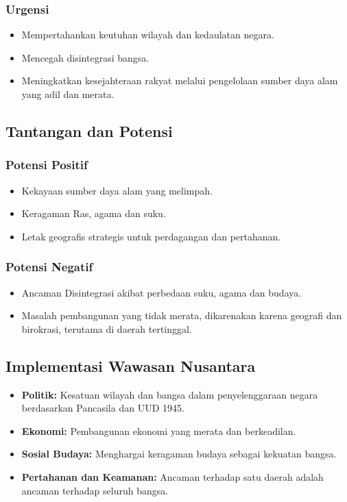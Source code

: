 \documentclass[12pt, a4paper]{article}
\begin{document}
\subsubsection*{Urgensi}
\begin{itemize}
    \item Mempertahankan keutuhan wilayah dan kedaulatan negara.
    \item Mencegah disintegrasi bangsa.
    \item Meningkatkan kesejahteraan rakyat melalui pengelolaan sumber daya alam yang adil dan merata.
\end{itemize}

\subsection*{Tantangan dan Potensi}
\subsubsection*{Potensi Positif}
\begin{itemize}
    \item Kekayaan sumber daya alam yang melimpah.
    \item Keragaman Ras, agama dan suku.
    \item Letak geografis strategis untuk perdagangan dan pertahanan.
\end{itemize}

\subsubsection*{Potensi Negatif}
\begin{itemize}
    \item Ancaman Disintegrasi akibat perbedaan suku, agama dan budaya.
    \item Masalah pembangunan yang tidak merata, dikarenakan karena geografi dan birokrasi, terutama di daerah tertinggal.
\end{itemize}

\subsection*{Implementasi Wawasan Nusantara}
\begin{itemize}
    \item \textbf{Politik:} Kesatuan wilayah dan bangsa dalam penyelenggaraan negara berdasarkan Pancasila dan UUD 1945.
    \item \textbf{Ekonomi:} Pembangunan ekonomi yang merata dan berkeadilan.
    \item \textbf{Sosial Budaya:} Menghargai keragaman budaya sebagai kekuatan bangsa.
    \item \textbf{Pertahanan dan Keamanan:} Ancaman terhadap satu daerah adalah ancaman terhadap seluruh bangsa.
\end{itemize}
\end{document}
